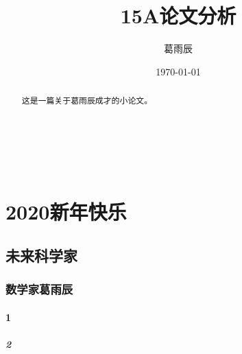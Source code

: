 \documentclass[UTF-8]{ctexart}
\begin{document}
\title{15A论文分析}
\author{葛雨辰}
\date{\today}
\maketitle



\begin{abstract}         %
\small{这是一篇关于葛雨辰成才的小论文。}
\end{abstract}




\newcommand{\song}{\CJKfamily{song}}       %
\newcommand{\fs}{\CJKfamily{fs}}           %
\newcommand{\kai}{\CJKfamily{kai}}         %
\newcommand{\hei}{\CJKfamily{hei}}         %
\newcommand{\li}{\CJKfamily{li}}           %
\newcommand{\yihao}{\fontsize{26pt}{36pt}\selectfont}          
\newcommand{\erhao}{\fontsize{22pt}{28pt}\selectfont}          
\newcommand{\xiaoer}{\fontsize{18pt}{18pt}\selectfont}        
\newcommand{\sanhao}{\fontsize{16pt}{24pt}\selectfont}        
\newcommand{\xiaosan}{\fontsize{15pt}{22pt}\selectfont}        
\newcommand{\sihao}{\fontsize{14pt}{21pt}\selectfont}          
\newcommand{\banxiaosi}{\fontsize{13pt}{19.5pt}\selectfont}    
\newcommand{\xiaosi}{\fontsize{12pt}{18pt}\selectfont}        
\newcommand{\dawuhao}{\fontsize{11pt}{11pt}\selectfont}        
\newcommand{\wuhao}{\fontsize{10.5pt}{15.75pt}\selectfont}     




\tableofcontents
\section{2020新年快乐}
	\heiti\sanhao{2019寒假初作：15A论文分析}
	\songti\xiaosi{葛雨辰}
	\songti\xiaosi{\today}
	\subsection{未来科学家}
		\subsubsection{数学家葛雨辰}
			\paragraph{1}
				\lipsum[1]
					\subparagraph{2}
						\lipsum[1]
\end{document}
